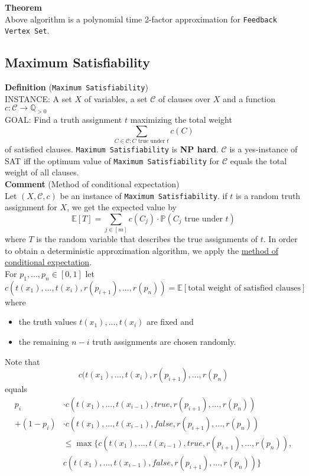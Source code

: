 \documentclass[a4paper, 12pt]{article}
\begin{document}
	\noindent\textbf{Theorem}\\
	Above algorithm is a polynomial time 2-factor approximation for \texttt{Feedback Vertex Set}.
	\subsection{Maximum Satisfiability}
	\textbf{Definition} (\texttt{Maximum Satisfiability})\\
	INSTANCE: A set $X$ of variables, a set $\mathcal{C}$ of clauses over $X$ and a function $c: \mathcal{C} \to \mathbb{Q}_{>0}$\\
	GOAL: Find a truth assignment $t$ maximizing the total weight  \[\sum_{C \in \mathcal{C}: C \text{ true under } t} c(C)\]
	of satisfied clauses. \texttt{Maximum Satisfiability} is \textbf{NP hard}. $\mathcal{C}$ is a yes-instance of SAT iff the optimum value of \texttt{Maximum Satisfiability} for $\mathcal{C}$ equals the total weight of all clauses.\\
	\textbf{Comment} (Method of conditional expectation)\\
	Let $(X,\mathcal{C},c)$ be an instance of \texttt{Maximum Satisfiability}. if $t$ is a random truth assignment for $X$, we get the expected value by \[\mathbb{E}[T] = \sum_{j \in [m]} c(C_j)\cdot \mathbb{P}(C_j \text{ true under } t)\]
	where $T$ is the random variable that describes the true assignments of $t$. In order to obtain a deterministic approximation algorithm, we apply the \underline{method of conditional expectation}.\\
	For $p_1,...,p_n \in [0,1]$ let \[c(t(x_1),...,t(x_i),r(p_{i+1}),...,r(p_n)) = \mathbb{E}[\text{total weight of satisfied clauses}]\]
	where \begin{itemize}
		\item the truth values $t(x_1),...,t(x_i)$ are fixed and 
		\item the remaining $n-i$ truth assignments are chosen randomly. 
	\end{itemize}
	Note that \[c(t(x_1),...,t(x_i),r(p_{i+1}),...,r(p_n)\]
	equals \begin{align*}
		p_i &\cdot c(t(x_1),...,t(x_{i-1}), true,r(p_{i+1}),...,r(p_n))\\ + (1-p_i)&\cdot c(t(x_1),...,t(x_{i-1}),false,r(p_{i+1}),...,r(p_n))\\
		&\leq \max \{c(t(x_1),...,t(x_{i-1}), true,r(p_{i+1}),...,r(p_n)),\\ &c(t(x_1),...,t(x_{i-1}),false,r(p_{i+1}),...,r(p_n))\}
	\end{align*}
\end{document}
